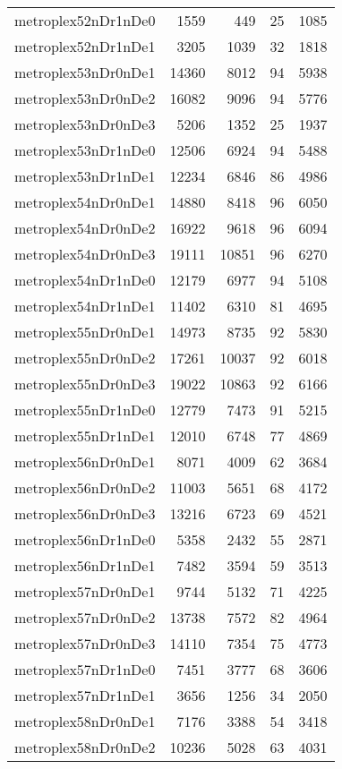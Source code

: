 \begin{longtable}{lrrrr}
metroplex52nDr1nDe0 & 1559 & 449 & 25 & 1085 \\
metroplex52nDr1nDe1 & 3205 & 1039 & 32 & 1818 \\
metroplex53nDr0nDe1 & 14360 & 8012 & 94 & 5938 \\
metroplex53nDr0nDe2 & 16082 & 9096 & 94 & 5776 \\
metroplex53nDr0nDe3 & 5206 & 1352 & 25 & 1937 \\
metroplex53nDr1nDe0 & 12506 & 6924 & 94 & 5488 \\
metroplex53nDr1nDe1 & 12234 & 6846 & 86 & 4986 \\
metroplex54nDr0nDe1 & 14880 & 8418 & 96 & 6050 \\
metroplex54nDr0nDe2 & 16922 & 9618 & 96 & 6094 \\
metroplex54nDr0nDe3 & 19111 & 10851 & 96 & 6270 \\
metroplex54nDr1nDe0 & 12179 & 6977 & 94 & 5108 \\
metroplex54nDr1nDe1 & 11402 & 6310 & 81 & 4695 \\
metroplex55nDr0nDe1 & 14973 & 8735 & 92 & 5830 \\
metroplex55nDr0nDe2 & 17261 & 10037 & 92 & 6018 \\
metroplex55nDr0nDe3 & 19022 & 10863 & 92 & 6166 \\
metroplex55nDr1nDe0 & 12779 & 7473 & 91 & 5215 \\
metroplex55nDr1nDe1 & 12010 & 6748 & 77 & 4869 \\
metroplex56nDr0nDe1 & 8071 & 4009 & 62 & 3684 \\
metroplex56nDr0nDe2 & 11003 & 5651 & 68 & 4172 \\
metroplex56nDr0nDe3 & 13216 & 6723 & 69 & 4521 \\
metroplex56nDr1nDe0 & 5358 & 2432 & 55 & 2871 \\
metroplex56nDr1nDe1 & 7482 & 3594 & 59 & 3513 \\
metroplex57nDr0nDe1 & 9744 & 5132 & 71 & 4225 \\
metroplex57nDr0nDe2 & 13738 & 7572 & 82 & 4964 \\
metroplex57nDr0nDe3 & 14110 & 7354 & 75 & 4773 \\
metroplex57nDr1nDe0 & 7451 & 3777 & 68 & 3606 \\
metroplex57nDr1nDe1 & 3656 & 1256 & 34 & 2050 \\
metroplex58nDr0nDe1 & 7176 & 3388 & 54 & 3418 \\
metroplex58nDr0nDe2 & 10236 & 5028 & 63 & 4031 \\

\end{longtable}
